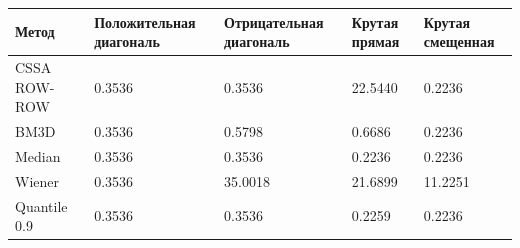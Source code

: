 \begin{tabular}{|l|l|l|l|l|}
\hline
Метод & Положительная диагональ & Отрицательная диагональ & Крутая прямая & Крутая смещенная \\
\hline
CSSA ROW-ROW & 0.3536 & 0.3536 & 22.5440 & 0.2236 \\
\hline
BM3D & 0.3536 & 0.5798 & 0.6686 & 0.2236 \\
\hline
Median & 0.3536 & 0.3536 & 0.2236 & 0.2236 \\
\hline
Wiener & 0.3536 & 35.0018 & 21.6899 & 11.2251 \\
\hline
Quantile 0.9 & 0.3536 & 0.3536 & 0.2259 & 0.2236 \\
\hline
\end{tabular}
